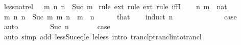\begin{isabellebody}
%
\isamarkuptrue%
%
\endisatagdocument
{\isafolddocument}%
%
\isadelimdocument
%
\endisadelimdocument
{}\isamarkupfalse%
\ less{\isacharunderscore}{\kern0pt}nat{\isacharunderscore}{\kern0pt}rel{\isacharcolon}{\kern0pt}\ {\isachardoublequoteopen}{\isacharparenleft}{\kern0pt}{\isacharless}{\kern0pt}{\isacharparenright}{\kern0pt}\ {\isacharequal}{\kern0pt}\ {\isacharparenleft}{\kern0pt}{\isasymlambda}m\ n{\isachardot}{\kern0pt}\ n\ {\isacharequal}{\kern0pt}\ Suc\ m{\isacharparenright}{\kern0pt}\isactrlsup {\isacharplus}{\kern0pt}\isactrlsup {\isacharplus}{\kern0pt}{\isachardoublequoteclose}\isanewline
%
\isadelimproof
%
\endisadelimproof
%
\isatagproof
{}\isamarkupfalse%
\ {\isacharparenleft}{\kern0pt}rule\ ext{\isacharcomma}{\kern0pt}\ rule\ ext{\isacharcomma}{\kern0pt}\ rule\ iffI{\isacharparenright}{\kern0pt}\isanewline
\ \ \isamarkupfalse%
\ n\ m\ {\isacharcolon}{\kern0pt}{\isacharcolon}{\kern0pt}\ nat\isanewline
\ \ \isamarkupfalse%
\ {\isachardoublequoteopen}{\isacharparenleft}{\kern0pt}{\isasymlambda}m\ n{\isachardot}{\kern0pt}\ n\ {\isacharequal}{\kern0pt}\ Suc\ m{\isacharparenright}{\kern0pt}\isactrlsup {\isacharplus}{\kern0pt}\isactrlsup {\isacharplus}{\kern0pt}\ m\ n{\isachardoublequoteclose}\ \ {\isachardoublequoteopen}m\ {\isacharless}{\kern0pt}\ n{\isachardoublequoteclose}\isanewline
\ \ \ \ \isamarkupfalse%
\ that\isanewline
\ \ \isamarkupfalse%
\ {\isacharparenleft}{\kern0pt}induct\ n{\isacharparenright}{\kern0pt}\isanewline
\ \ \ \ \isamarkupfalse%
\ {}\isanewline
\ \ \ \ \isamarkupfalse%
\ \isamarkupfalse%
\ {\isacharquery}{\kern0pt}case\ \isamarkupfalse%
\ auto\isanewline
\ \ \isamarkupfalse%
\isanewline
\ \ \ \ \isamarkupfalse%
\ {\isacharparenleft}{\kern0pt}Suc\ n{\isacharparenright}{\kern0pt}\isanewline
\ \ \ \ \isamarkupfalse%
\ \isamarkupfalse%
\ {\isacharquery}{\kern0pt}case\isanewline
\ \ \ \ \ \ \isamarkupfalse%
\ {\isacharparenleft}{\kern0pt}auto\ simp\ add{\isacharcolon}{\kern0pt}\ less{\isacharunderscore}{\kern0pt}Suc{\isacharunderscore}{\kern0pt}eq{\isacharunderscore}{\kern0pt}le\ le{\isacharunderscore}{\kern0pt}less\ intro{\isacharcolon}{\kern0pt}\ tranclp{\isachardot}{\kern0pt}trancl{\isacharunderscore}{\kern0pt}into{\isacharunderscore}{\kern0pt}trancl{\isacharparenright}{\kern0pt}\isanewline
\ \ \isamarkupfalse%

\end{isabellebody}
